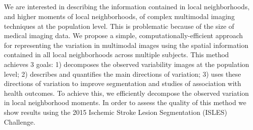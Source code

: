 \documentclass[a0,landscape]{a0poster}
\begin{document}
\vspace{1cm} %


\begin{multicols}{3} %


\color{black} %

\normalsize{\section*{}}
\noindent We are interested in describing the information contained in local neighborhoods, and higher moments of local neighborhoods, of complex multimodal imaging techniques at the population level. This is problematic because of the size of medical imaging data. We propose a simple, computationally-efficient approach for representing the variation in multimodal images using the spatial information contained in all local neighborhoods across multiple subjects. This method achieves 3 goals: 1) decomposes the observed variability images at the population level; 2) describes and quantifies the main directions of variation; 3) uses these directions of variation to improve segmentation and studies of association with health outcomes. To achieve this, we efficiently decompose the observed variation in local neighborhood moments. In order to assess the quality of this method we show results using the 2015 Ischemic Stroke Lesion Segmentation (ISLES) Challenge.\vspace{.5cm}



\end{multicols}
\end{document}
